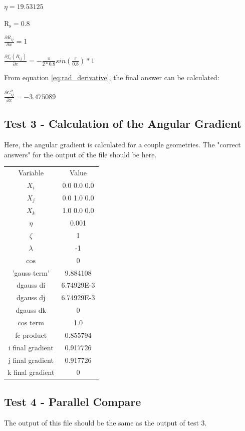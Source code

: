 \documentclass{article}
\begin{document}
$\eta = 19.53125$

$\mathrm{R_s} = 0.8$

$\frac{\partial R_{ij}}{\partial x} = 1$

$\frac{\partial f_c (R_{ij}) } { \partial x} = - \frac{\pi}{2 * 0.8} sin \left( \frac {\pi}{0.8} \right) * 1 $

From equation \eqref{eq:rad_derivative}, the final answer can be calculated:

$\frac{\partial G^2_{ij}}{\partial x} = -3.475089$

\subsection{Test 3 - Calculation of the Angular Gradient}
Here, the angular gradient is calculated for a couple geometries.
The "correct answers" for the output of the file should be here.

\begin{center}
\begin{tabular}{ |c|c| }
Variable     & Value \\
$X_i$        &  0.0 0.0 0.0 \\
$X_j$        &  0.0 1.0 0.0 \\
$X_k$        &  1.0 0.0 0.0 \\
$\eta$       & 0.001 \\
$\zeta$      & 1 \\
$\lambda$    & -1 \\
$\cos$       & 0 \\
'gauss term' & 9.884108 \\
dgauss di    & 6.74929E-3 \\
dgauss dj    & 6.74929E-3 \\
dgauss dk    & 0 \\
cos term     & 1.0 \\
fc product   & 0.855794 \\
i final gradient & 0.917726 \\
j final gradient & 0.917726 \\
k final gradient & 0

\end{tabular}
\end{center}


\subsection{Test 4 - Parallel Compare}
The output of this file should be the same as the output of test 3.
\end{document}
